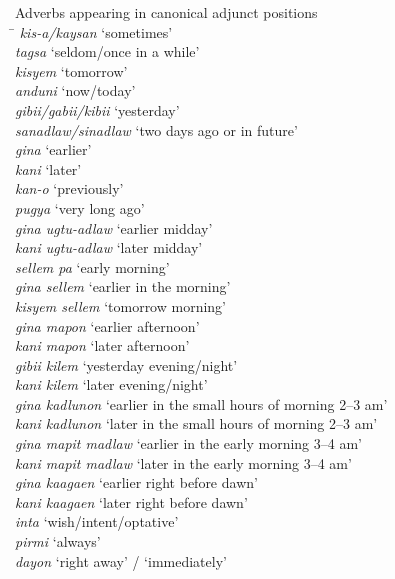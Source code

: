 \ea
\label{bkm:Ref479947563}
\begin{tabbing}
    
Adverbs appearing in canonical adjunct positions \\
\hspace{3.5cm} \= \kill
\textit{kis-a/kaysan } \>  ‘sometimes’ \\
\textit{tagsa } \>  ‘seldom/once in a while’ \\
\textit{kisyem } \>  ‘tomorrow’ \\
\textit{anduni } \>  ‘now/today’ \\
\textit{gibii/gabii/kibii } \>  ‘yesterday’ \\
\textit{sanadlaw/sinadlaw } \>  ‘two days ago or in future’ \\
\textit{gina } \>  ‘earlier’ \\
\textit{kani } \>  ‘later’ \\
\textit{kan-o } \>  ‘previously’ \\
\textit{pugya } \>  ‘very long ago’ \\
\textit{gina ugtu-adlaw } \>  ‘earlier midday' \\
\textit{kani ugtu-adlaw } \>  ‘later midday’ \\
\textit{sellem pa } \>  ‘early morning’ \\
\textit{gina sellem } \>  ‘earlier in the morning’ \\
\textit{kisyem sellem } \>  ‘tomorrow morning’ \\
\textit{gina mapon } \>  ‘earlier afternoon’ \\
\textit{kani mapon } \>  ‘later afternoon’ \\
\textit{gibii kilem } \>  ‘yesterday evening/night’ \\
\textit{kani kilem } \>  ‘later evening/night’ \\
\textit{gina kadlunon } \>  ‘earlier in the small hours of morning 2--3 am’ \\
\textit{kani kadlunon } \>  ‘later in the small hours of morning 2--3 am’ \\
\textit{gina mapit madlaw } \>  ‘earlier in the early morning 3--4 am’ \\
\textit{kani mapit madlaw } \>  ‘later in the early morning 3--4 am’ \\
\textit{gina kaagaen } \>  ‘earlier right before dawn’ \\
\textit{kani kaagaen } \>  ‘later right before dawn’ \\
\textit{inta } \>   ‘wish/intent/optative’ \\
\textit{pirmi } \>  ‘always’ \\
\textit{dayon } \>  ‘right away’ / ‘immediately’
\end{tabbing}
\z

